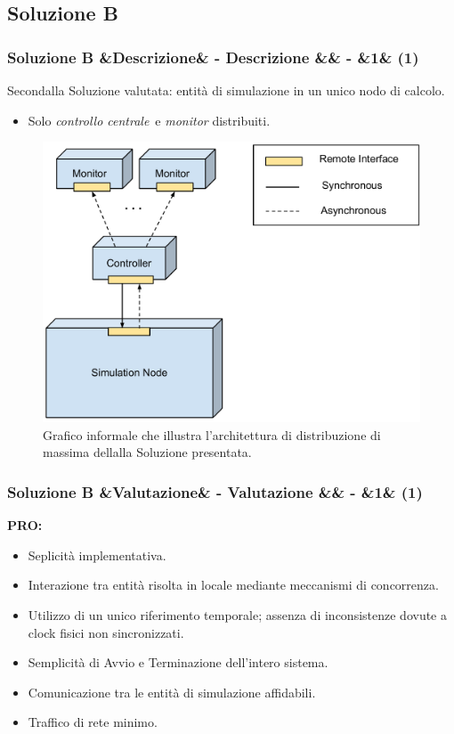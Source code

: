 \documentclass[slidestop,compress,blackandwhite]{beamer}
\newcommand{\ii}[1]{\textit{#1}}
\newcommand{\controller}{\ii{controllo centrale}}
\newcommand{\PRO}{\textbf{PRO:}}
\newcommand{\newtitle}[4]{
	#1 
	\ifx&#2&%
	\else
  		\large- #2
	\fi
	\ifx&#3&%
	\else
  		\normalsize- #3
	\fi
	\ifx&#4&%
	\else
  		\normalsize (#4)
	\fi
}
\newcommand{\newframe}[5]{
	\begin{frame}
		\frametitle{\newtitle{#1}{#2}{#3}{#4}}
		#5
	\end{frame}
}
\begin{document}
	\subsection{Soluzione B}
	\newframe{Soluzione B}{Descrizione}{}{1}{
		Secondalla Soluzione valutata: entità di simulazione in un unico nodo di calcolo.
		\begin{itemize}
			\item Solo \controller~e \ii{monitor} distribuiti.
		\end{itemize}
		
		\begin{figure}
			\includegraphics[scale=0.22,trim=0mm 5mm 0mm 0mm]{imgs/nothing_distributed.pdf}
			\caption{\small Grafico informale che illustra l'architettura di distribuzione di massima dellalla Soluzione presentata.}
		\end{figure}
		
	}
	
	\newframe{Soluzione B}{Valutazione}{}{1}{
		\vspace{0.5cm}
		\PRO
			\begin{itemize}
				\item Seplicità implementativa.
				\item Interazione tra entità risolta in locale mediante meccanismi di concorrenza.
				\item Utilizzo di un unico riferimento temporale; assenza di inconsistenze dovute a clock fisici non sincronizzati.
				\item Semplicità di Avvio e Terminazione dell'intero sistema.
				\item Comunicazione tra le entità di simulazione affidabili.
				\item Traffico di rete minimo.
			\end{itemize}
	}
	
\end{document}
